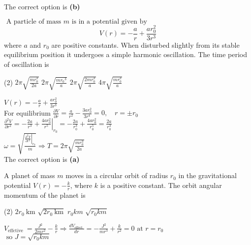 \begin{enumerate}
\begin{answer}
	The correct option is \textbf{(b)}
\end{answer}
\begin{minipage}{\textwidth}
	\item $\text { A particle of mass } m \text { is in a potential given by }$
	$$V(r)=-\frac{a}{r}+\frac{a r_{0}^{2}}{3 r^{3}}$$
	where $a$ and $r_{0}$ are positive constants. When disturbed slightly from its stable equilibrium position it undergoes a simple harmonic oscillation. The time period of oscillation is
\end{minipage}
\begin{tasks}(2)
	\task[\textbf{A.}] $2 \pi \sqrt{\frac{m r_{0}^{3}}{2 a}}$
	\task[\textbf{B.}]$2 \pi \sqrt{\frac{m r_{0}{ }^{3}}{a}}$
	\task[\textbf{C.}]$2 \pi \sqrt{\frac{2 m r_{0}^{3}}{a}}$
	\task[\textbf{D.}]$4 \pi \sqrt{\frac{m r_{0}^{3}}{a}}$
\end{tasks}
\begin{answer}
	$V(r)=-\frac{a}{r}+\frac{a r_{0}^{2}}{3 r^{3}}$\\
	For equilibrium $\frac{\partial V}{\partial r}=\frac{a}{r^{2}}-\frac{3 a r_{0}^{2}}{3 r^{4}}=0, \quad r=\pm r_{0}$ \\
	$\frac{\partial^{2} V}{\partial r^{2}}=-\frac{2 a}{r^{3}}+\left.\frac{4 a r_{0}^{2}}{r^{5}}\right|_{r_{0}}=-\frac{2 a}{r_{0}^{3}}+\frac{4 a r_{0}^{2}}{r_{0}^{5}}=\frac{2 a}{r_{0}^{3}}$\\
	$\omega=\sqrt{\frac{\left.\frac{\partial^{2} V}{\partial r^{2}}\right|_{r_{0}}}{m}} \Rightarrow T=2 \pi \sqrt{\frac{m r_{0}^{3}}{2 a}}$\\
	The correct option is \textbf{(a)}
\end{answer}
\begin{minipage}{\textwidth}
	\item A planet of mass $m$ moves in a circular orbit of radius $r_{0}$ in the gravitational potential $V(r)=-\frac{k}{r}$, where $k$ is a positive constant. The orbit angular momentum of the planet is
\end{minipage}
\begin{tasks}(2)
	\task[\textbf{A.}] $2 r_{0} \mathrm{~km}$
	\task[\textbf{B.}]$\sqrt{2 r_{0} \mathrm{~km}}$
	\task[\textbf{C.}]$r_{0} k m$
	\task[\textbf{D.}]$\sqrt{r_{0} k m}$
\end{tasks}
\begin{answer}
$V_{\text {effctive }}=\frac{J^{2}}{2 m r^{2}}-\frac{k}{r} \Rightarrow \frac{d V_{\text {effect }}}{d r}=-\frac{J^{2}}{m r^{3}}+\frac{k}{r^{2}}=0 \text { at } r=r_{0}$\\
$\text { so } J=\sqrt{r_{0} k m}$	
\end{answer}
\end{enumerate}